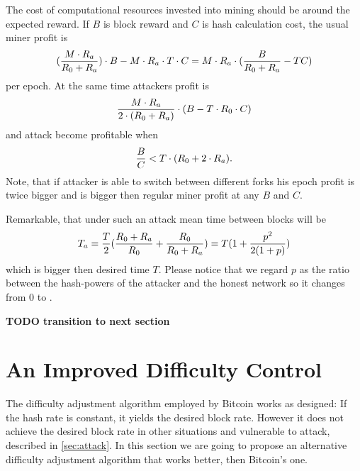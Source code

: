 \documentclass[number,preprint,review]{elsarticle}
\def\infinity{\rotatebox{90}{8}}
\begin{document}
The cost of computational resources invested into mining should be around the expected reward.
If \(B\) is block reward and \(C\) is hash calculation cost, the usual miner profit is
\begin{equation}
{({M\cdot R_a\over R_0+R_a})\cdot B-M\cdot R_a\cdot T\cdot C=M\cdot R_a\cdot ({B\over R_0+R_a}-TC)}
\end{equation}
per epoch.
At the same time attackers profit is
\begin{equation}
{{M\cdot R_a \over 2\cdot (R_0+R_a)}\cdot (B - T\cdot R_0\cdot C)}
\end{equation}
and attack become profitable when
\begin{equation}
{{B\over C} < T\cdot (R_0+2\cdot R_a)}.
\end{equation}
Note, that if attacker is able to switch between different forks his epoch profit is twice bigger and is bigger then regular miner profit at any \(B\) and \(C\).


Remarkable, that under such an attack mean time between blocks will be
\begin{equation}
\label{eq:ati}
{T_a={T\over 2}({R_0+R_a\over R_0} + {R_0\over R_0+R_a})=T(1 + {p^2\over 2(1+p)})}
\end{equation}
which is bigger then desired time \(T\).
Please notice that we regard \(p\) as the ratio between the hash-powers of the attacker and the honest network so it changes from 0 to \infinity.

\textbf{TODO transition to next section}

\section{An Improved Difficulty Control}
\label{sec:improved}

The difficulty adjustment algorithm employed by Bitcoin works as designed: If the hash rate is constant, it yields the desired block rate.
However it does not achieve the desired block rate in other situations and vulnerable to attack, described in \ref{sec:attack}.
In this section we are going to propose an alternative difficulty adjustment algorithm that works better, then Bitcoin's one.
\end{document}
